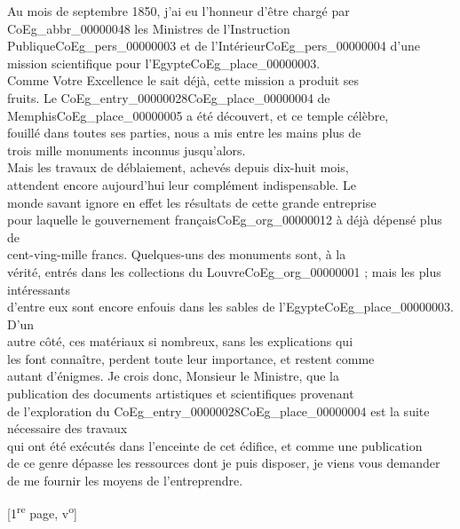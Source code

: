 \documentclass{book}
\begin{document}
\indent Au mois de septembre 1850, j’ai eu l’honneur d’être chargé par\\
\gls{CoEg_abbr_00000048} les Ministres de l’Instruction Publique\gls{CoEg_pers_00000003} et de l’Intérieur\gls{CoEg_pers_00000004} d’une\\
mission scientifique pour l’Egypte\gls{CoEg_place_00000003}.\\
\indent Comme Votre Excellence le sait déjà, cette mission a produit ses\\
fruits. Le \Gls{CoEg_entry_00000028}\gls{CoEg_place_00000004} de Memphis\gls{CoEg_place_00000005} a été découvert, et ce temple célèbre,\\
fouillé dans toutes ses parties, nous a mis entre les mains plus de\\
trois mille monuments inconnus jusqu’alors.\\
\indent Mais les travaux de déblaiement, achevés depuis dix-huit mois,\\
attendent encore aujourd’hui leur complément indispensable. Le\\
monde savant ignore en effet les résultats de cette grande entreprise\\
pour laquelle le gouvernement français\gls{CoEg_org_00000012} à déjà dépensé plus de\\
cent-ving-mille francs. Quelques-uns des monuments sont, à la\\
vérité, entrés dans les collections du Louvre\gls{CoEg_org_00000001} ; mais les plus intéressants\\
d’entre eux sont encore enfouis dans les sables de l’Egypte\gls{CoEg_place_00000003}. D’un\\
autre côté, ces matériaux si nombreux, sans les explications qui\\
les font connaître, perdent toute leur importance, et restent comme\\
autant d’énigmes. Je crois donc, Monsieur le Ministre, que la\\
publication des documents artistiques et scientifiques provenant\\
de l’exploration du \Gls{CoEg_entry_00000028}\gls{CoEg_place_00000004} est la suite nécessaire des travaux\\
qui ont été exécutés dans l’enceinte de cet édifice, et comme une publication\\
de ce genre dépasse les ressources dont je puis disposer, je viens vous demander\\
de me fournir les moyens de l’entreprendre.
{\footnotesize\begin{center} {[1\textsuperscript{re} page, v\textsuperscript{o}]}\end{center}}
\end{document}
